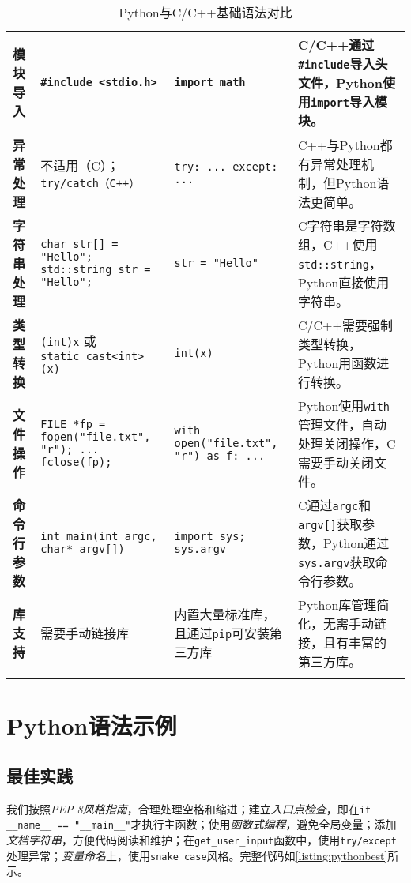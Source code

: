 \begin{longtable}{|p{1.7cm}|p{3.8cm}|p{3.8cm}|p{4cm}|}
    \hline
    \textbf{模块导入} & \texttt{\#include <stdio.h>} & \texttt{import math} & C/C++通过\texttt{\#include}导入头文件，Python使用\texttt{import}导入模块。 \\
    \hline
    \textbf{异常处理} & 不适用（C）；\texttt{try/catch（C++）} & \texttt{try: ... except: ...} & C++与Python都有异常处理机制，但Python语法更简单。 \\
    \hline
    \textbf{字符串处理} & \texttt{char str[] = "Hello"; \newline std::string str = "Hello";} & \texttt{str = "Hello"} & C字符串是字符数组，C++使用\texttt{std::string}，Python直接使用字符串。 \\
    \hline
    \textbf{类型转换} & \texttt{(int)x} 或 \texttt{static\_cast<int>(x)} & \texttt{int(x)} & C/C++需要强制类型转换，Python用函数进行转换。 \\
    \hline
    \textbf{文件操作} & \texttt{FILE *fp = fopen("file.txt", "r"); ... fclose(fp);} & \texttt{with open("file.txt", "r") as f: ...} & Python使用\texttt{with}管理文件，自动处理关闭操作，C需要手动关闭文件。 \\
    \hline
    \textbf{命令行参数} & \texttt{int main(int argc, char* argv[])} & \texttt{import sys; sys.argv} & C通过\texttt{argc}和\texttt{argv[]}获取参数，Python通过\texttt{sys.argv}获取命令行参数。 \\
    \hline
    \textbf{库支持} & 需要手动链接库 & 内置大量标准库，且通过\texttt{pip}可安装第三方库 & Python库管理简化，无需手动链接，且有丰富的第三方库。 \\
    \hline

    \caption{Python与C/C++基础语法对比}
    \label{tab:pythonvscpp}
\end{longtable}

\section{Python语法示例}

\subsection{最佳实践}

我们按照\textit{PEP 8风格指南}，合理处理空格和缩进；建立\textit{入口点检查}，即在\texttt{if \_\_name\_\_ == "\_\_main\_\_"}才执行主函数；使用\textit{函数式编程}，避免全局变量；添加\textit{文档字符串}，方便代码阅读和维护；在\texttt{get\_user\_input}函数中，使用\texttt{try/except}处理异常；\textit{变量命名}上，使用\texttt{snake\_case}风格。完整代码如\autoref{listing:pythonbest}所示。\\

